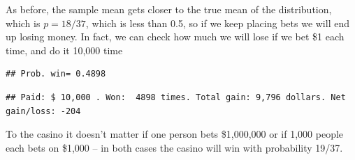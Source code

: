 As before, the sample mean gets closer to the true mean of the distribution, which is $p=18/37$, which is less than 0.5, so if we keep placing bets we will end up losing money. In fact, we can check how much we will lose if we bet \$1 each time, and do it 10,000 time

\begin{knitrout}
\color{fgcolor}\begin{kframe}
\begin{alltt}
 \hlkwb{<-} 
 \hlkwb{<-}  \hlstd{,} \hlopt{/}\hlstd{)}
\hlstd{(}\hlstd{,} \hlstd{)}
\end{alltt}
\begin{verbatim}
## Prob. win= 0.4898
\end{verbatim}
\begin{alltt}
\hlstd{(}\hlstd{,}  \hlstd{=}\hlstd{),} \hlstd{,}  \hlstd{,} \hlstd{,} \hlstd{(}\hlopt{*}  \hlstd{=} \hlstd{),} \hlstd{,} \hlstd{(}\hlopt{*}\hlopt{-} \hlstd{=} \hlstd{),}\hlstd{)}
\end{alltt}
\begin{verbatim}
## Paid: $ 10,000 . Won:  4898 times. Total gain: 9,796 dollars. Net gain/loss: -204
\end{verbatim}
\end{kframe}
\end{knitrout}

To the casino it doesn't matter if one person bets \$1,000,000 or if 1,000 people each bets on \$1,000 -- in both cases the casino will win with probability 19/37.
